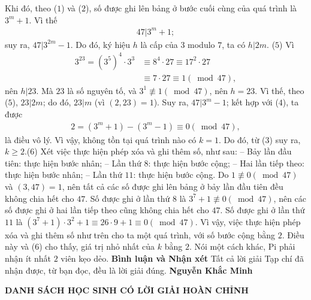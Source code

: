 \begin{multicols}{2}
	\vskip 0.05cm
	Khi đó, theo ($1$) và ($2$), số được ghi lên bảng ở bước cuối cùng của quá trình là $3^m + 1$. Vì thế
	\begin{align*}
		47|{3^m} + 1; \tag{$4$}
	\end{align*}
	suy ra,  $47|{3^{2m}} - 1$. Do đó, ký hiệu $h$ là cấp của $3$ modulo $7$, ta có  $h|2m$. \hfill   ($5$)
	\vskip 0.05cm
	Vì
	\begin{align*}
		{3^{23}} = {\left( {{3^5}} \right)^4} \cdot {3^3} &\equiv {8^4} \cdot 27 \equiv {17^2} \cdot 27 \\
		&\equiv 7 \cdot 27 \equiv 1\left( {\bmod 47} \right),
	\end{align*}
	nên $h|23$.  Mà $23$ là số nguyên tố, và ${3^1}\not  \equiv 1\left( {\bmod 47} \right)$,  nên $h = 23$. Vì thế, theo ($5$),  $23|2m$; do đó, $23|m$  (vì $(2, 23) = 1$). Suy ra, $47|3^m-1$; kết hợp với ($4$), ta được
	\begin{align*}
		2 = \left( {{3^m} + 1} \right) - \left( {{3^m} - 1} \right) \equiv 0\left( {\bmod 47} \right),
	\end{align*}
	là điều vô lý.
	\vskip 0.05cm
	Vì vậy, không tồn tại quá trình nào có $k = 1$. Do đó, từ ($3$) suy ra, $k \ge 2$.\hfill      ($6$)
	\vskip 0.05cm
	Xét việc thực hiện phép xóa và ghi thêm số, như sau:
	\vskip 0.05cm
	-- Bảy lần đầu tiên: thực hiện bước nhân;
	\vskip 0.05cm
	-- Lần thứ $8$: thực hiện bước cộng;
	\vskip 0.05cm
	-- Hai lần tiếp theo: thực hiện bước nhân;
	\vskip 0.05cm
	-- Lần thứ $11$: thực hiện bước cộng.
	\vskip 0.05cm
	Do $1\not  \equiv 0\left( {\bmod 47} \right)$  và $(3, 47) = 1$, nên tất cả các số được ghi lên bảng ở bảy lần đầu tiên đều không chia hết cho $47$.
	\vskip 0.05cm
	Số được ghi ở lần thứ $8$ là  ${3^7} + 1\not  \equiv 0\left( {\bmod 47} \right)$, nên các số được ghi ở hai lần tiếp theo cũng không chia hết cho $47$.
	\vskip 0.05cm
	Số được ghi ở lần thứ $11$ là  $\left( {{3^7} + 1} \right) \cdot {3^2} + 1 \equiv 26 \cdot 9 + 1 \equiv 0\left( {\bmod 47} \right)$.
	\vskip 0.05cm
	Vì vậy, việc thực hiện phép xóa và ghi thêm số như trên cho ta một quá trình, với số bước cộng bằng $2$. Điều này và ($6$) cho thấy, giá trị nhỏ nhất của $k$ bằng $2$. Nói một cách khác, Pi phải nhận ít nhất $2$ viên kẹo dẻo.
	\vskip 0.05cm
	\textbf{\color{thachthuctoanhoc}Bình luận và Nhận xét}
	\vskip 0.05cm
	Tất cả lời giải Tạp chí đã nhận được, từ bạn đọc, đều là lời giải đúng.
	\vskip 0.05cm
	\hfill\textbf{\color{thachthuctoanhoc}Nguyễn Khắc Minh}
\end{multicols}
\begin{center}
	\textbf{\color{thachthuctoanhoc}DANH SÁCH HỌC SINH CÓ LỜI GIẢI HOÀN CHỈNH}
\end{center}
